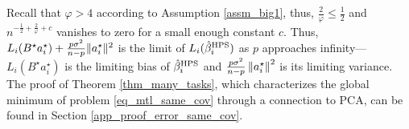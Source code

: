 Recall that $\varphi > 4$ according to Assumption \ref{assm_big1}, thus, $\frac {2}{\varphi} \le \frac 1 2$ and $n^{-\frac 1 2 + \frac 2 {\varphi} + c}$ vanishes to zero for a small enough constant $c$.
Thus, $L_i(B^{\star} a_i^{\star}) + \frac{p\sigma^2}{n - p} \|a_i^{\star}\|^2$ is the limit of $L_i(\hat{\beta}_i^{\textup{HPS}})$ as $p$ approaches infinity---$L_i(B^{\star} a_i^{\star})$ is the limiting bias of $\hat{\beta}_i^{\textup{HPS}}$ and $\frac{p \sigma^2}{n - p} \left\| a_i^{\star} \right\|^2$ is its limiting variance.
The proof of Theorem \ref{thm_many_tasks}, which characterizes the global minimum of problem \eqref{eq_mtl_same_cov} through a connection to PCA, can be found in Section \ref{app_proof_error_same_cov}.
